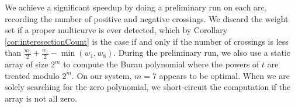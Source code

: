 We achieve a significant speedup by doing a preliminary run on each arc, recording the number of positive and negative crossings. We discard the weight set if a proper multicurve is ever detected, which by Corollary \ref{cor:interesectionCount} is the case if and only if the number of crossings is less than $\frac{w_0}{2} + \frac{w_1}{2} - \min(w_1, w_8)$. During the preliminary run, we also use a static array of size $2^m$ to compute the Burau polynomial where the powers of $t$ are treated modulo $2^m$. On our system, $m = 7$ appears to be optimal. When we are solely searching for the zero polynomial, we short-circuit the computation if the array is not all zero.

